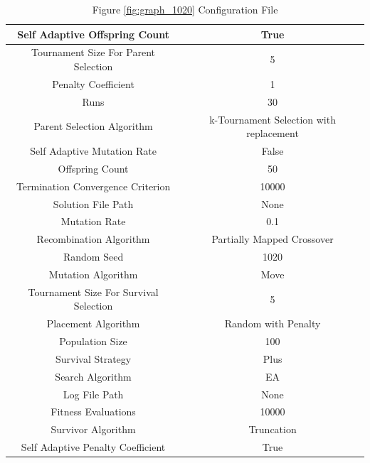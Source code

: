 \documentclass{standalone}
\begin{document}
\begin{table}[!htb]
	\centering
	\caption{Figure \ref{fig:graph_1020} Configuration File}
	\label{tab:graph_1020}
	\begin{tabular}{| c | c |}
		\hline
		Self Adaptive Offspring Count		& True		 \\
		\hline
		Tournament Size For Parent Selection		& 5		 \\
		\hline
		Penalty Coefficient		& 1		 \\
		\hline
		Runs		& 30		 \\
		\hline
		Parent Selection Algorithm		& k-Tournament Selection with replacement		 \\
		\hline
		Self Adaptive Mutation Rate		& False		 \\
		\hline
		Offspring Count		& 50		 \\
		\hline
		Termination Convergence Criterion		& 10000		 \\
		\hline
		Solution File Path		& None		 \\
		\hline
		Mutation Rate		& 0.1		 \\
		\hline
		Recombination Algorithm		& Partially Mapped Crossover		 \\
		\hline
		Random Seed		& 1020		 \\
		\hline
		Mutation Algorithm		& Move		 \\
		\hline
		Tournament Size For Survival Selection		& 5		 \\
		\hline
		Placement Algorithm		& Random with Penalty		 \\
		\hline
		Population Size		& 100		 \\
		\hline
		Survival Strategy		& Plus		 \\
		\hline
		Search Algorithm		& EA		 \\
		\hline
		Log File Path		& None		 \\
		\hline
		Fitness Evaluations		& 10000		 \\
		\hline
		Survivor Algorithm		& Truncation		 \\
		\hline
		Self Adaptive Penalty Coefficient		& True		 \\
		\hline
	\end{tabular}
\end{table}
\end{document}
